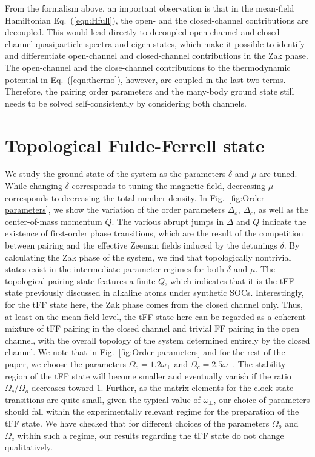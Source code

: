 \documentclass[a4paper, aps,pra, twocolumn, superscriptaddress, showpacs]{revtex4}
\begin{document}
From the formalism above, an important observation is that in the mean-field Hamiltonian Eq.~(\ref{eqn:Hfull}), the open- and the closed-channel contributions are decoupled. This would lead directly to decoupled open-channel and closed-channel quasiparticle spectra and eigen states, which make it possible to identify and differentiate open-channel and closed-channel contributions in the Zak phase. The open-channel and the close-channel contributions to the thermodynamic potential in Eq.~(\ref{eqn:thermo}), however, are coupled in the last two terms. Therefore, the pairing order parameters and the many-body ground state still needs to be solved self-consistently by considering both channels.



\section{Topological Fulde-Ferrell state}
\label{sec:tff}
We study the ground state of the system as the parameters $\delta$ and $\mu$ are tuned. While changing $\delta$ corresponds to tuning the magnetic field, decreasing $\mu$ corresponds to decreasing the total number density. In Fig.~\ref{fig:Order-parameters}, we show the variation of the order parameters $\Delta_o$, $\Delta_c$, as well as the center-of-mass momentum $Q$. The various abrupt jumps in $\Delta$ and $Q$ indicate the existence of first-order phase transitions, which are the result of the competition between pairing and the effective Zeeman fields induced by the detunings $\delta$. By calculating the Zak phase of the system, we find that topologically nontrivial states exist in the intermediate parameter regimes for both $\delta$ and $\mu$. The topological pairing state features a finite $Q$, which indicates that it is the tFF state previously discussed in alkaline atoms under synthetic SOCs. Interestingly, for the tFF state here, the Zak phase comes from the closed channel only. Thus, at least on the mean-field level, the tFF state here can be regarded as a coherent mixture of tFF pairing in the closed channel and trivial FF pairing in the open channel, with the overall topology of the system determined entirely by the closed channel. We note that in Fig.~\ref{fig:Order-parameters} and for the rest of the paper, we choose the parameters $\Omega_{o}=1.2\omega_{\perp}$ and $\Omega_{c}=2.5\omega_{\perp}$. The stability region of the tFF state will become smaller and eventually vanish if the ratio $\Omega_c/\Omega_o$ decreases toward $1$. Further, as the matrix elements for the clock-state transitions are quite small, given the typical value of $\omega_{\perp}$, our choice of parameters should fall within the experimentally relevant regime for the preparation of the tFF state. We have checked that for different choices of the parameters $\Omega_o$ and $\Omega_c$ within such a regime, our results regarding the tFF state do not change qualitatively.
\end{document}
